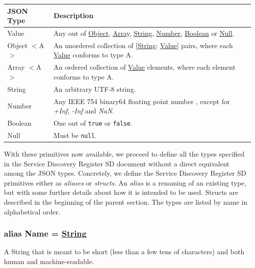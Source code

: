 \documentclass[a4paper]{arrowhead}
\newcommand{\pdef}[1]{{\textcolor{ArrowheadGrey}{#1 \label{sec:model:primitives:#1} \label{sec:model:primitives:#1s}}}}
\newcommand{\pref}[1]{{\textcolor{ArrowheadGrey}{\hyperref[sec:model:primitives:#1]{#1}}}}
\begin{document}
\begin{table}[ht!]
\begin{tabularx}{\textwidth}{| p{3cm} | X |} \hline
\rowcolor{gray!33} JSON Type & Description \\ \hline
\pdef{Value}                 & Any out of \pref{Object}, \pref{Array}, \pref{String}, \pref{Number}, \pref{Boolean} or \pref{Null}. \\ \hline
\pdef{Object}$<$A$>$         & An unordered collection of $[$\pref{String}: \pref{Value}$]$ pairs, where each \pref{Value} conforms to type A. \\ \hline
\pdef{Array}$<$A$>$          & An ordered collection of \pref{Value} elements, where each element conforms to type A. \\ \hline
\pdef{String}                & An arbitrary UTF-8 string. \\ \hline
\pdef{Number}                & Any IEEE 754 binary64 floating point number \cite{cowlishaw2019floating}, except for \textit{+Inf}, \textit{-Inf} and \textit{NaN}. \\ \hline
\pdef{Boolean}               & One out of \texttt{true} or \texttt{false}. \\ \hline
\pdef{Null}                  & Must be \texttt{null}. \\ \hline
\end{tabularx}
\end{table}

With these primitives now available, we proceed to define all the types specified in the Service Discovery Register SD document without a direct equivalent among the JSON types.
Concretely, we define the Service Discovery Register SD primitives either as \textit{aliases} or \textit{structs}.
An \textit{alias} is a renaming of an existing type, but with some further details about how it is intended to be used.
Structs are described in the beginning of the parent section.
The types are listed by name in alphabetical order.

\subsubsection{alias \pdef{Name} = \pref{String}}

A String that is meant to be short (less than a few tens of characters) and both human and machine-readable.

\newpage



\end{document}

